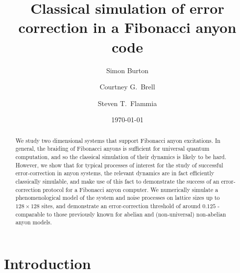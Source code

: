 \documentclass[a4paper,nofootinbib,superscriptaddress]{revtex4}
\begin{document}
\title{Classical simulation of error correction in a Fibonacci anyon code}

\author{Simon Burton}
\author{Courtney G.\ Brell}
\author{Steven T.\ Flammia}

\date{\today}

\begin{abstract}
We study two dimensional systems that support Fibonacci anyon excitations. In general, the braiding of Fibonacci anyons is sufficient for universal quantum computation, and so the classical simulation of their dynamics is likely to be hard. However, we show that for typical processes of interest for the study of successful error-correction in anyon systems, the relevant dynamics are in fact efficiently classically simulable, and make use of this fact to demonstrate the success of an error-correction protocol for a Fibonacci anyon computer.  We numerically simulate a phenomenological model of the system and noise processes on lattice sizes up to $128\times128$ sites, and demonstrate an error-correction threshold of around $0.125$ - comparable to those previously known for abelian and (non-universal) non-abelian anyon models.
\end{abstract}

\maketitle




\section{Introduction}



\end{document}
